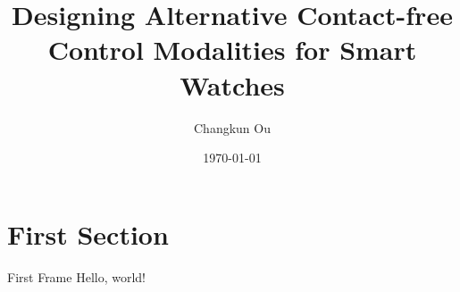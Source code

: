 \documentclass{beamer}
\title{Designing Alternative Contact-free Control Modalities for Smart Watches}
\date{\today}
\author{Changkun Ou}
\institute{Computer Science and Technology}
\begin{document}
  \maketitle
  \section{First Section}
  \begin{frame}{First Frame}
    Hello, world!
  \end{frame}
\end{document}
